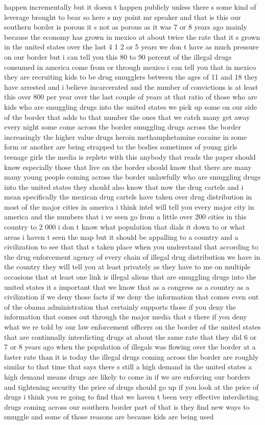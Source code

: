 \documentclass{article}
\begin{document}
happen incrementally but it doesn t happen publicly unless there s some kind of leverage brought to bear so here s my point mr speaker and that is this our southern border is porous it s not as porous as it was 7 or 8 years ago mainly because the economy has grown in mexico at about twice the rate that it s grown in the united states over the last 4 1 2 or 5 years we don t have as much pressure on our border but i can tell you this 80 to 90 percent of the illegal drugs consumed in america come from or through mexico i can tell you that in mexico they are recruiting kids to be drug smugglers between the ages of 11 and 18 they have arrested and i believe incarcerated and the number of convictions is at least this over 800 per year over the last couple of years at that ratio of those who are kids who are smuggling drugs into the united states we pick up some on our side of the border that adds to that number the ones that we catch many get away every night some come across the border smuggling drugs across the border increasingly the higher value drugs heroin methamphetamine cocaine in some form or another are being strapped to the bodies sometimes of young girls teenage girls the media is replete with this anybody that reads the paper should know especially those that live on the border should know that there are many many young people coming across the border unlawfully who are smuggling drugs into the united states they should also know that now the drug cartels and i mean specifically the mexican drug cartels have taken over drug distribution in most of the major cities in america i think intel will tell you every major city in america and the numbers that i ve seen go from a little over 200 cities in this country to 2 000 i don t know what population that dials it down to or what areas i haven t seen the map but it should be appalling to a country and a civilization to see that that s taken place when you understand that according to the drug enforcement agency of every chain of illegal drug distribution we have in the country they will tell you at least privately as they have to me on multiple occasions that at least one link is illegal aliens that are smuggling drugs into the united states it s important that we know that as a congress as a country as a civilization if we deny those facts if we deny the information that comes even out of the obama administration that certainly supports those if you deny the information that comes out through the major media that s there if you deny what we re told by our law enforcement officers on the border of the united states that are continually interdicting drugs at about the same rate that they did 6 or 7 or 8 years ago when the population of illegals was flowing over the border at a faster rate than it is today the illegal drugs coming across the border are roughly similar to that time that says there s still a high demand in the united states a high demand means drugs are likely to come in if we are enforcing our borders and tightening security the price of drugs should go up if you look at the price of drugs i think you re going to find that we haven t been very effective interdicting drugs coming across our southern border part of that is they find new ways to smuggle and some of those reasons are because kids are being used 
\end{document}
